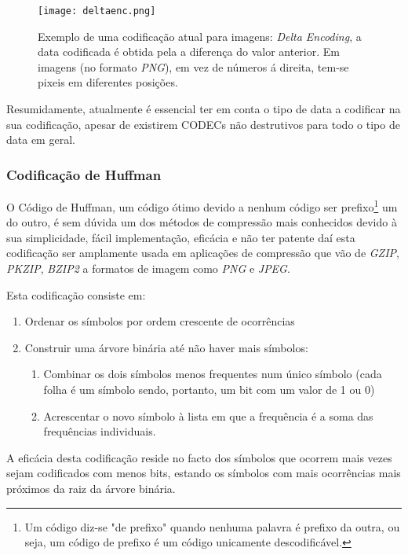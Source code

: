 \documentclass[12pt,journal,compsoc]{IEEEtran}
\begin{document}
\begin{figure}[h]
\texttt{[image: deltaenc.png]}
\caption{Exemplo de uma codificação atual para imagens: \textit{Delta Encoding}, a data codificada é obtida pela a diferença do valor anterior. Em imagens (no formato \textit{PNG}), em vez de números á direita, tem-se pixeis em diferentes posições.}
\end{figure}

Resumidamente, atualmente  é essencial ter em conta o tipo de data a codificar na sua codificação, apesar de existirem CODECs não destrutivos para todo o tipo de data em geral.



\subsubsection{Codificação de Huffman} 

O Código de Huffman, um código ótimo devido a nenhum código ser prefixo\footnote{Um código diz-se "de prefixo" quando nenhuma palavra é prefixo da outra, ou seja, um código de prefixo é um código unicamente descodificável.} um do outro, é sem dúvida um dos métodos de compressão mais conhecidos devido à sua simplicidade, fácil implementação, eficácia e não ter patente daí esta codificação ser amplamente usada em aplicações de compressão que vão de \textit{GZIP}, \textit{PKZIP}, \textit{BZIP2} a formatos de imagem como \textit{PNG} e \textit{JPEG}.

Esta codificação consiste em:

\begin{enumerate}
    \item Ordenar os símbolos por ordem crescente de ocorrências
    \item Construir uma árvore binária até não haver mais símbolos:
    \begin{enumerate}
        \item Combinar os dois símbolos menos frequentes num único símbolo (cada folha é um símbolo sendo, portanto, um bit com um valor de 1 ou 0)
        
        
        \item Acrescentar o novo símbolo à lista em que a frequência é a soma das frequências individuais.
    \end{enumerate}
\end{enumerate}

A eficácia desta codificação reside no facto dos símbolos que ocorrem mais vezes sejam codificados com menos bits, estando os símbolos com mais ocorrências mais próximos da raiz da árvore binária.
\end{document}
